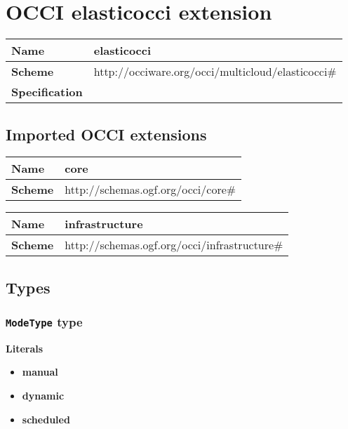 \section{OCCI elasticocci extension}
\begin{center}
\begin{tabular}{|l|l|}
  \hline
  \textbf{Name} & elasticocci \\
  \hline  
  \textbf{Scheme} & http://occiware.org/occi/multicloud/elasticocci\# \\
  \hline
  \textbf{Specification} &  \\
  \hline
\end{tabular}
\end{center}

\subsection{Imported OCCI extensions}

\begin{center} 
\begin{tabular}{|l|l|}
  \hline
  \textbf{Name} & core \\
  \hline  
  \textbf{Scheme} & http://schemas.ogf.org/occi/core\# \\
  \hline
\end{tabular}
\end{center}
\begin{center} 
\begin{tabular}{|l|l|}
  \hline
  \textbf{Name} & infrastructure \\
  \hline  
  \textbf{Scheme} & http://schemas.ogf.org/occi/infrastructure\# \\
  \hline
\end{tabular}
\end{center}


\subsection{Types}
\subsubsection{\texttt{ModeType} type}

\textbf{Literals}
\begin{itemize}
\item \textbf{manual} 
\end{itemize}
\begin{itemize}
\item \textbf{dynamic} 
\end{itemize}
\begin{itemize}
\item \textbf{scheduled} 
\end{itemize}

